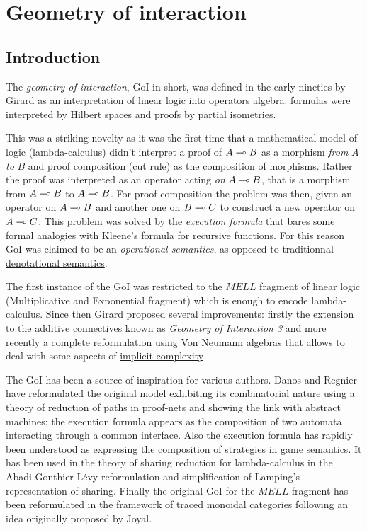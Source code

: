 \chapter{Geometry of interaction}\label{geometry-of-interaction}

\section{Introduction}

The \emph{geometry of interaction}, GoI in short, was defined in the
early nineties by Girard as an interpretation of linear logic into
operators algebra: formulas were interpreted by Hilbert spaces and
proofs by partial isometries.

This was a striking novelty as it was the first time that a mathematical
model of logic (lambda-calculus) didn't interpret a proof of
\(A\multimap B\) as a morphism \emph{from} \(A\) \emph{to} \(B\) and proof
composition (cut rule) as the composition of morphisms. Rather the proof
was interpreted as an operator acting \emph{on} \(A\multimap B\), that is a
morphism from \(A\multimap B\) to \(A\multimap B\). For proof composition the
problem was then, given an operator on \(A\multimap B\) and another one on
\(B\multimap C\) to construct a new operator on \(A\multimap C\). This problem
was solved by the \emph{execution formula} that bares some formal
analogies with Kleene's formula for recursive functions. For this reason
GoI was claimed to be an \emph{operational semantics}, as opposed to
traditionnal \hyperref[semantics]{denotational semantics}.

The first instance of the GoI was restricted to the \(MELL\) fragment of
linear logic (Multiplicative and Exponential fragment) which is enough
to encode lambda-calculus. Since then Girard proposed several
improvements: firstly the extension to the additive connectives known as
\emph{Geometry of Interaction 3} and more recently a complete
reformulation using Von Neumann algebras that allows to deal with some
aspects of \hyperref[light-linear-logics]{implicit complexity}

The GoI has been a source of inspiration for various authors. Danos and
Regnier have reformulated the original model exhibiting its
combinatorial nature using a theory of reduction of paths in proof-nets
and showing the link with abstract machines; the execution formula
appears as the composition of two automata interacting through a common
interface. Also the execution formula has rapidly been understood as
expressing the composition of strategies in game semantics. It has been
used in the theory of sharing reduction for lambda-calculus in the
Abadi-Gonthier-Lévy reformulation and simplification of Lamping's
representation of sharing. Finally the original GoI for the \(MELL\)
fragment has been reformulated in the framework of traced monoidal
categories following an idea originally proposed by Joyal.


